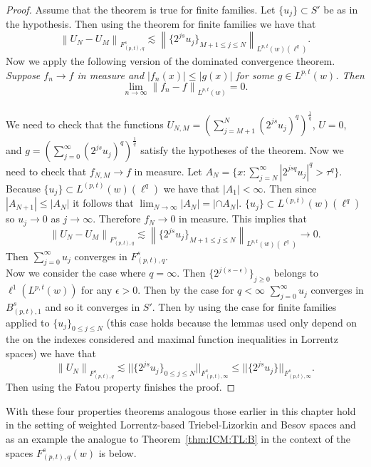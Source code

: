 \documentclass[10pt,a4paper]{article}
\theoremstyle{remark}
\newcommand{\itlw}[4]{F_{#1,#3}^{#2}(#4)} %
\newcommand{\itl}[3]{F_{#1,#3}^{#2}} %
\newcommand{\norm}[2]{\left\|#1\right\|_{#2}}
\begin{document}
\begin{proof}
Assume that the theorem is true for finite families. Let $\{u_j\} \subset S'$ be as in the hypothesis. Then using the theorem for finite families we have that 
\begin{equation}
\norm{U_N - U_M}{\itl{(p,t)}{s}{q}} \lesssim \norm{ \{2^{js} u_j\}_{M+1\leq j \leq N}}{L^{p,t}(w)(\ell^q)}.
\end{equation}
Now we apply the following version of the dominated convergence theorem. 
\\
\bigskip
\textit{Suppose $f_n \rightarrow f$ in measure and $|f_n (x)| \leq |g(x)|$ for some $g\in L^{p,t}(w)$. Then $$\lim_{n\rightarrow\infty} \norm{f_n-f}{L^{p,t}(w)} = 0.$$}
\\
\bigskip
We need to check that the functions $U_{N,M} = \left(\sum_{j=M+1}^{N} (2^{js} u_j)^q \right)^\frac{1}{q}$, $U=0$, and $g = \left(\sum_{j=0}^\infty (2^{js}u_j)^q \right)^\frac{1}{q}$ satisfy the hypotheses of the theorem. Now we need to check that $f_{N,M}\rightarrow f$ in measure. Let $A_N = \{ x : \sum^\infty_{j=N} |2^{jsq}u_j|^q > \tau^q \}$. Because $\{u_j\} \subset L^{(p,t)}(w)(\ell^{q})$ we have that $|A_1| < \infty$. Then since $|A_{N+1}| \leq |A_{N}|$ it follows that $\lim_{N\rightarrow\infty} |A_N| = |\cap A_N|$. $\{u_j\} \subset L^{(p,t)}(w)(\ell^{q})$ so $u_j \rightarrow 0$ as $j\rightarrow\infty$. Therefore $f_N \rightarrow 0$ in measure. This implies that 
$$ \norm{U_N - U_M}{\itl{(p,t)}{s}{q}} \lesssim \norm{\{2^{js}u_j\}_{M+1\leq j \leq N}}{L^{p,t}(w)(\ell^q)} \rightarrow 0.$$
Then $\sum_{j=0}^\infty u_j$ converges in $\itl{(p,t)}{s}{q}$. 
\\
Now we consider the case where $q=\infty$. Then $\{2^{j(s-\epsilon)}\}_{j\geq0}$ belongs to $\ell^1(L^{p,t}(w))$ for any $\epsilon >0$. Then by the case for $q<\infty$ $\sum_{j=0}^\infty u_j$ converges in $B^s_{(p,t),1}$ and so it converges in $S'$. Then by using the case for finite families applied to $\{u_j\}_{0\leq j \leq N}$ (this case holds because the lemmas used only depend on the on the indexes considered and maximal function inequalities in Lorrentz spaces) we have that 
\[ \norm{U_N}{\itl{(p,t)}{s}{q}} \lesssim ||\{2^{js}u_j\}_{0\leq j \leq N}||_{F^s_{(p,t),\infty}} \leq ||\{2^{js}u_j\}||_{F^s_{(p,t),\infty}}. \] Then using the Fatou property finishes the proof.
\end{proof}

With these four properties theorems analogous those earlier in this chapter hold in the setting of weighted Lorrentz-based Triebel-Lizorkin and Besov spaces and as an example the analogue to Theorem~\ref{thm:ICM:TL:B} in the context of the spaces $\itlw{(p,t)}{s}{q}{w}$ is below.
\end{document}
